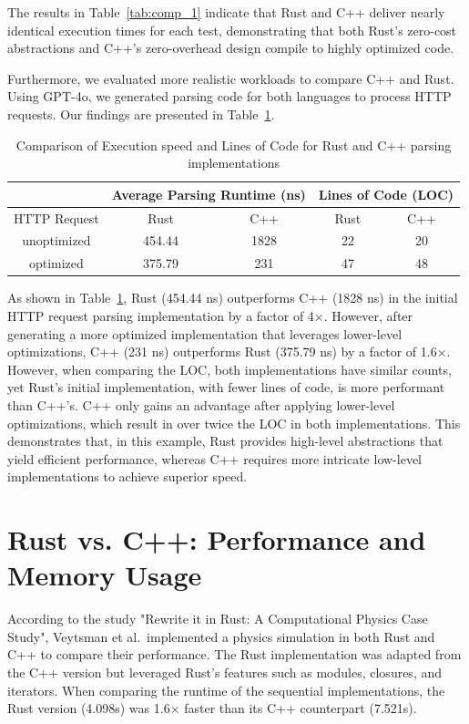The results in Table~\ref{tab:comp_1} indicate that Rust and C++ deliver nearly identical execution times for each test, demonstrating that both Rust’s zero-cost abstractions and C++’s zero-overhead design compile to highly optimized code.

Furthermore, we evaluated more realistic workloads to compare C++ and Rust. Using GPT-4o, we generated parsing code \cite[]{sColfrozenlIquidBenchmark2025} for both languages to process HTTP requests. Our findings are presented in Table~\ref{tab:comp_2}.

\begin{table}[H]
    \centering
    \begin{tabular}{|c|c|c|c|c|}
        \hline
        & \multicolumn{2}{c|}{Average Parsing Runtime (ns)} & \multicolumn{2}{c|}{Lines of Code (LOC)} \\  
        \hline
        HTTP Request & Rust & C++ & Rust & C++ \\
        \hline
        unoptimized & 454.44 & 1828 & 22 & 20 \\
        optimized & 375.79 & 231 & 47 & 48 \\
        \hline
    \end{tabular}
    \caption{Comparison of Execution speed and Lines of Code for Rust and C++ parsing implementations}
    \label{tab:comp_2}
\end{table}

As shown in Table~\ref{tab:comp_2}, Rust (454.44 ns) outperforms C++ (1828 ns) in the initial HTTP request parsing implementation by a factor of 4×. However, after generating a more optimized implementation that leverages lower-level optimizations, C++ (231 ns) outperforms Rust (375.79 ns) by a factor of 1.6×. However, when comparing the LOC, both implementations have similar counts, yet Rust's initial implementation, with fewer lines of code, is more performant than C++'s. C++ only gains an advantage after applying lower-level optimizations, which result in over twice the LOC in both implementations. This demonstrates that, in this example, Rust provides high-level abstractions that yield efficient performance, whereas C++ requires more intricate low-level implementations to achieve superior speed.

\section{Rust vs. C++: Performance and Memory Usage}

According to the study "Rewrite it in Rust: A Computational Physics Case Study"\cite{veytsmanRewriteItRust2024}, Veytsman et al.\ implemented a physics simulation in both Rust and C++ to compare their performance. The Rust implementation was adapted from the C++ version but leveraged Rust’s features such as modules, closures, and iterators. When comparing the runtime of the sequential implementations, the Rust version (4.098s) was 1.6× faster than its C++ counterpart (7.521s).

